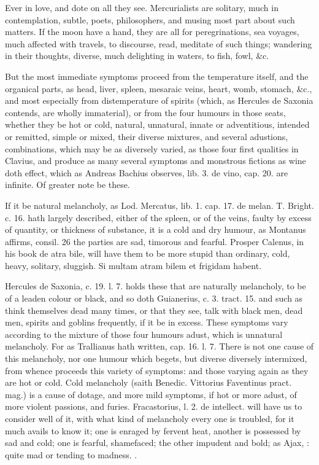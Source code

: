 {Ever in love, and dote on all they see. Mercurialists are solitary,
much in contemplation, subtle, poets, philosophers, and musing most
part about such matters. If the moon have a hand, they are all for
peregrinations, sea voyages, much affected with travels, to discourse,
read, meditate of such things; wandering in their thoughts, diverse,
much delighting in waters, to fish, fowl, \&c.

But the most immediate symptoms proceed from the temperature itself,
and the organical parts, as head, liver, spleen, mesaraic veins, heart,
womb, stomach, \&c., and most especially from distemperature of spirits
(which, as Hercules de Saxonia contends, are wholly immaterial),
or from the four humours in those seats, whether they be hot or cold,
natural, unnatural, innate or adventitious, intended or remitted,
simple or mixed, their diverse mixtures, and several adustions,
combinations, which may be as diversely varied, as those four
first qualities in  Clavius, and produce as many several symptoms
and monstrous fictions as wine doth effect, which as Andreas Bachius
observes, lib. 3. de vino, cap. 20. are infinite. Of greater note be
these.

If it be natural melancholy, as Lod. Mercatus, lib. 1. cap. 17. de
melan. T. Bright. c. 16. hath largely described, either of the spleen,
or of the veins, faulty by excess of quantity, or thickness of
substance, it is a cold and dry humour, as Montanus affirms, consil. 26
the parties are sad, timorous and fearful. Prosper Calenus, in his book
\textlatin{de atra bile}, will have them to be more stupid than ordinary, cold,
heavy, solitary, sluggish. Si multam atram bilem et frigidam habent.

Hercules de Saxonia, c. 19. l. 7. holds these that are naturally
melancholy, to be of a leaden colour or black, and so doth Guianerius,
c. 3. tract. 15. and such as think themselves dead many times, or that
they see, talk with black men, dead men, spirits and goblins
frequently, if it be in excess. These symptoms vary according to the
mixture of those four humours adust, which is unnatural melancholy. For
as Trallianus hath written, cap. 16. l. 7. There is not one cause
of this melancholy, nor one humour which begets, but diverse diversely
intermixed, from whence proceeds this variety of symptoms: and those
varying again as they are hot or cold. Cold melancholy (saith
Benedic. Vittorius Faventinus pract. mag.) is a cause of dotage, and
more mild symptoms, if hot or more adust, of more violent passions, and
furies. Fracastorius, l. 2. de intellect. will have us to consider well
of it, with what kind of melancholy every one is troubled, for it
much avails to know it; one is enraged by fervent heat, another is
possessed by sad and cold; one is fearful, shamefaced; the other
impudent and bold; as Ajax, : quite mad or tending to madness. .

}
